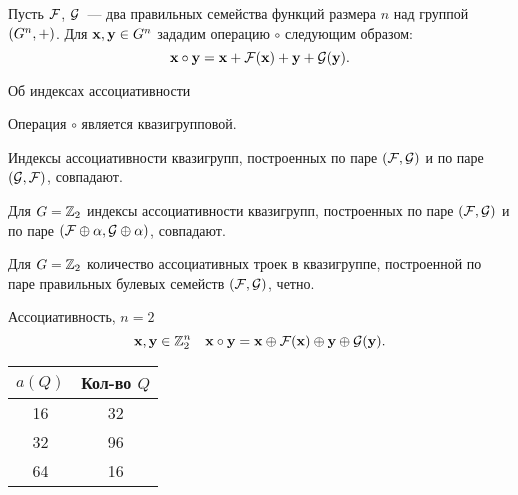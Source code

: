 \begin{frame}
    Пусть $\mathcal{F}$, $\mathcal{G}$~--- два правильных семейства функций размера $n$ над группой $(G^n, +)$.
    Для $\mathbf{x}, \mathbf{y} \in G^n$ зададим операцию $\circ$ следующим образом:
    \[
        \mathbf{x} \circ \mathbf{y} = \mathbf{x} + \mathcal{F}(\mathbf{x}) + \mathbf{y} + \mathcal{G}(\mathbf{y}).
    \]
    \pause 
    \begin{mytheorem}{Об индексах ассоциативности}
        \begin{coloritemize}
            \item Операция $\circ$ является квазигрупповой.
            \item Индексы ассоциативности квазигрупп, построенных по паре $(\mathcal{F}, \mathcal{G})$ и по паре $(\mathcal{G}, \mathcal{F})$, совпадают.
            \item Для $G = \mathbb{Z}_2$ индексы ассоциативности квазигрупп, построенных по паре $(\mathcal{F}, \mathcal{G})$ и по паре $(\mathcal{F} \oplus \alpha, \mathcal{G} \oplus \alpha)$, совпадают.
            \item Для $G = \mathbb{Z}_2$ количество ассоциативных троек в квазигруппе, построенной по паре правильных булевых семейств $(\mathcal{F}, \mathcal{G})$, четно.
        \end{coloritemize}
    \end{mytheorem}
\end{frame}


\begin{frame}{Ассоциативность, $n=2$}
    \[
        \mathbf{x}, \mathbf{y} \in \mathbb{Z}_2^n \quad \mathbf{x} \circ \mathbf{y} = \mathbf{x} \oplus \mathcal{F}(\mathbf{x}) \oplus \mathbf{y} \oplus \mathcal{G}(\mathbf{y}).
    \]

    \begin{center}
        \begin{tabular}{|c|c|}
            \hline
            \rowcolor{Gray}
            $a(Q)$ & Кол-во $Q$ \\
            \hline
            16 & 32 \\
            \hline
            32 & 96 \\
            \hline
            64 & 16 \\
            \hline
        \end{tabular}
    \end{center}
\end{frame}


